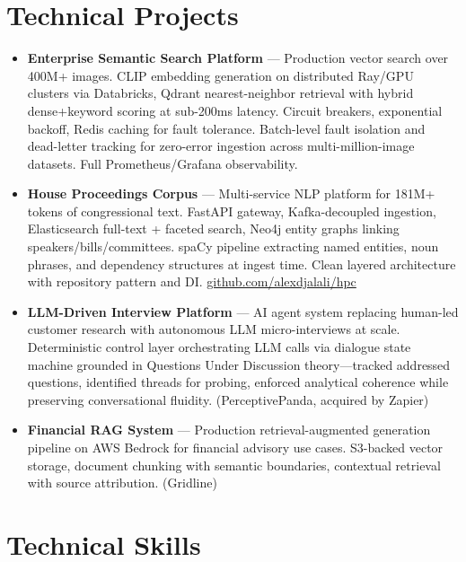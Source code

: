 \documentclass[9pt,letterpaper]{extarticle}
\begin{document}
\section{Technical Projects}

\begin{itemize}
  \item \textbf{Enterprise Semantic Search Platform} --- Production vector search over 400M+ images. CLIP embedding generation on distributed Ray/GPU clusters via Databricks, Qdrant nearest-neighbor retrieval with hybrid dense+keyword scoring at sub-200ms latency. Circuit breakers, exponential backoff, Redis caching for fault tolerance. Batch-level fault isolation and dead-letter tracking for zero-error ingestion across multi-million-image datasets. Full Prometheus/Grafana observability.
  \item \textbf{House Proceedings Corpus} --- Multi-service NLP platform for 181M+ tokens of congressional text. FastAPI gateway, Kafka-decoupled ingestion, Elasticsearch full-text + faceted search, Neo4j entity graphs linking speakers/bills/committees. spaCy pipeline extracting named entities, noun phrases, and dependency structures at ingest time. Clean layered architecture with repository pattern and DI. \href{https://github.com/alexdjalali/hpc}{github.com/alexdjalali/hpc}
  \item \textbf{LLM-Driven Interview Platform} --- AI agent system replacing human-led customer research with autonomous LLM micro-interviews at scale. Deterministic control layer orchestrating LLM calls via dialogue state machine grounded in Questions Under Discussion theory---tracked addressed questions, identified threads for probing, enforced analytical coherence while preserving conversational fluidity. (PerceptivePanda, acquired by Zapier)
  \item \textbf{Financial RAG System} --- Production retrieval-augmented generation pipeline on AWS Bedrock for financial advisory use cases. S3-backed vector storage, document chunking with semantic boundaries, contextual retrieval with source attribution. (Gridline)
\end{itemize}

\section{Technical Skills}
\end{document}
